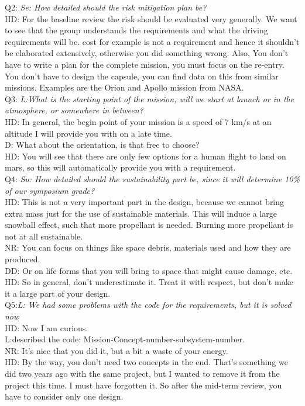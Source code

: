 Q2: \textit{Se: How detailed should the risk mitigation plan be?}\\
HD: For the baseline review the risk should be evaluated very generally. We want to see that the group understands the requirements and what the driving requirements will be. cost for example is not a requirement and hence it shouldn't be elaborated extensively, otherwise you did something wrong. Also, You don't have to write a plan for the complete mission, you must focus on the re-entry. You don't have to design the capsule, you can find data on this from similar missions. Examples are the Orion and Apollo mission from NASA.\\

Q3: \textit{L:What is the starting point of the mission, will we start at launch or in the atmosphere, or somewhere in between?}\\
HD: In general, the begin point of your mission is a speed of 7 km/s at an altitude I will provide you with on a late time.\\
D: What about the orientation, is that free to choose?\\
HD: You will see that there are only few options for a human flight to land on mars, so this will automatically provide you with a requirement.\\

Q4: \textit{Su: How detailed should the sustainability part be, since it will determine 10\% of our symposium grade?}\\
HD: This is not a very important part in the design, because we cannot bring extra mass just for the use of sustainable materials. This will induce a large snowball effect, such that more propellant is needed. Burning more propellant is not at all sustainable. \\
NR: You can focus on things like space debris, materials used and how they are produced.\\
DD: Or on life forms that you will bring to space that might cause damage, etc.\\
HD: So in general, don't underestimate it. Treat it with respect, but don't make it a large part of your design.\\

Q5:\textit{L: We had some problems with the code for the requirements, but it is solved now}\\
HD: Now I am curious.\\
L:described the code: Mission-Concept-number-subsystem-number.\\
NR: It's nice that you did it, but a bit a waste of your energy.\\
HD: By the way, you don't need two concepts in the end. That's something we did two years ago with the same project, but I wanted to remove it from the project this time. I must have forgotten it. So after the mid-term review, you have to consider only one design.\\

